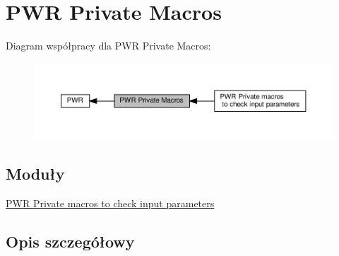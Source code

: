 \hypertarget{group___p_w_r___private___macros}{}\section{P\+WR Private Macros}
\label{group___p_w_r___private___macros}
Diagram współpracy dla P\+WR Private Macros\+:\nopagebreak
\begin{figure}[H]
\begin{center}
\leavevmode
\includegraphics[width=350pt]{group___p_w_r___private___macros}
\end{center}
\end{figure}
\subsection*{Moduły}
\begin{DoxyCompactItemize}
\item 
\hyperlink{group___p_w_r___i_s___p_w_r___definitions}{P\+W\+R Private macros to check input parameters}
\end{DoxyCompactItemize}


\subsection{Opis szczegółowy}
